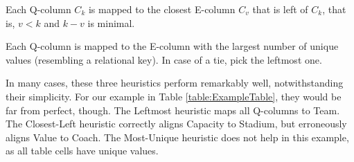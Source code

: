 \vspace{0.1cm}
Each Q-column $C_k$ is mapped to the closest
E-column $C_v$ that is left of $C_k$, that is,
$v < k$ and $k-v$ is minimal.

\vspace{0.1cm}
Each Q-column is mapped to the 
E-column with the largest number of unique values
(resembling a relational key).
In case of a tie, 
pick the leftmost one.
\vspace{0.1cm}

In many cases, these three heuristics perform remarkably well,
notwithstanding their simplicity.
For our example in Table \ref{table:ExampleTable},
they would be far from perfect, though.
The Leftmost heuristic maps all Q-columns to
Team. 
The Closest-Left heuristic correctly aligns
Capacity to Stadium, but erroneously 
aligns Value to Coach.
The Most-Unique heuristic does not help in
this example, as all table cells have unique values.


